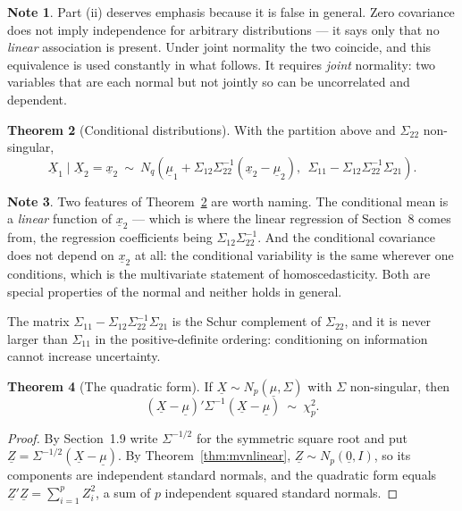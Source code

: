 \documentclass[11pt,a4paper]{article}
\theoremstyle{definition}
\newtheorem{thm}{Theorem}[section]
\newtheorem{note}[thm]{Note}
\begin{document}
\begin{note}
Part (ii) deserves emphasis because it is false in general. Zero covariance does
not imply independence for arbitrary distributions --- it says only that no
\emph{linear} association is present. Under joint normality the two coincide,
and this equivalence is used constantly in what follows. It requires
\emph{joint} normality: two variables that are each normal but not jointly so
can be uncorrelated and dependent.
\end{note}

\begin{thm}[Conditional distributions]
\label{thm:mvncond}
With the partition above and $\Sigma_{22}$ non-singular,
$$\underline{X}_1 \mid \underline{X}_2 = \underline{x}_2\ \sim\
N_q\left(\underline{\mu}_1 + \Sigma_{12}\Sigma_{22}^{-1}
\left(\underline{x}_2-\underline{\mu}_2\right),\ \
\Sigma_{11}-\Sigma_{12}\Sigma_{22}^{-1}\Sigma_{21}\right).$$
\end{thm}

\begin{note}
Two features of Theorem~\ref{thm:mvncond} are worth naming. The conditional mean
is a \emph{linear} function of $\underline{x}_2$ --- which is where the linear
regression of Section~8 comes from, the regression coefficients being
$\Sigma_{12}\Sigma_{22}^{-1}$. And the conditional covariance does not depend on
$\underline{x}_2$ at all: the conditional variability is the same wherever one
conditions, which is the multivariate statement of homoscedasticity. Both are
special properties of the normal and neither holds in general.

The matrix $\Sigma_{11}-\Sigma_{12}\Sigma_{22}^{-1}\Sigma_{21}$ is the Schur
complement of $\Sigma_{22}$, and it is never larger than $\Sigma_{11}$ in the
positive-definite ordering: conditioning on information cannot increase
uncertainty.
\end{note}

\begin{thm}[The quadratic form]
\label{thm:mvnchisq}
If $\underline{X}\sim N_p(\underline{\mu},\Sigma)$ with $\Sigma$ non-singular,
then
$$\left(\underline{X}-\underline{\mu}\right)'\Sigma^{-1}
\left(\underline{X}-\underline{\mu}\right)\ \sim\ \chi^{2}_{p}.$$
\end{thm}

\begin{proof}
By Section~1.9 write $\Sigma^{-1/2}$ for the symmetric square root and put
$\underline{Z} = \Sigma^{-1/2}\left(\underline{X}-\underline{\mu}\right)$. By
Theorem~\ref{thm:mvnlinear}, $\underline{Z}\sim N_p(\underline{0}, I)$, so its
components are independent standard normals, and the quadratic form equals
$\underline{Z}'\underline{Z} = \sum^{p}_{i=1}Z_i^{2}$, a sum of $p$ independent
squared standard normals.
\end{proof}
\end{document}

